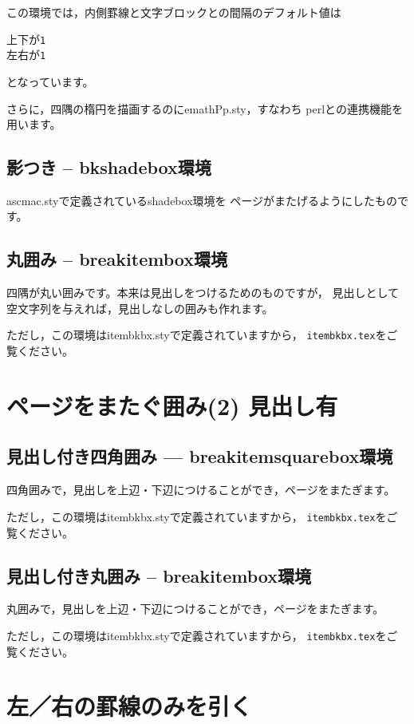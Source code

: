 \documentclass[a4j,fleqn]{jarticle}
\begin{document}
この環境では，内側罫線と文字ブロックとの間隔のデフォルト値は
\begin{jquote}
上下が\texttt{1\zh}\\
左右が\texttt{1\zw}
\end{jquote}
となっています。

さらに，四隅の楕円を描画するのに\textsf{emathPp.sty}，すなわち
\textsf{perl}との連携機能を用います。

\subsection{影つき -- bkshadebox環境}
\textsf{ascmac.sty}で定義されている\textsf{shadebox}環境を
ページがまたげるようにしたものです。



\subsection{丸囲み -- breakitembox環境}
四隅が丸い囲みです。本来は見出しをつけるためのものですが，
見出しとして空文字列を与えれば，見出しなしの囲みも作れます。

ただし，この環境は\textsf{itembkbx.sty}で定義されていますから，
\texttt{itembkbx.tex}をご覧ください。

\section{ページをまたぐ囲み(2) 見出し有}
\subsection{見出し付き四角囲み --- \textsf{breakitemsquarebox}環境}
四角囲みで，見出しを上辺・下辺につけることができ，ページをまたぎます。

ただし，この環境は\textsf{itembkbx.sty}で定義されていますから，
\texttt{itembkbx.tex}をご覧ください。

\subsection{見出し付き丸囲み -- breakitembox環境}
丸囲みで，見出しを上辺・下辺につけることができ，ページをまたぎます。

ただし，この環境は\textsf{itembkbx.sty}で定義されていますから，
\texttt{itembkbx.tex}をご覧ください。

\section{左／右の罫線のみを引く}
\end{document}
